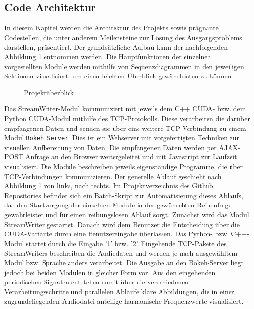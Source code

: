 
\subsection{Code Architektur}

In diesem Kapitel werden die Architektur des Projekts sowie prägnante Codestellen, die unter anderem Meilensteine zur Lösung des Ausgangsproblems darstellen, präsentiert. Der grundsätzliche Aufbau kann der nachfolgenden Abbildung \ref{fig:OV} entnommen werden. Die Hauptfunktionen der einzelnen vorgestellten Module werden mithilfe von Sequenzdiagrammen in den jeweiligen Sektionen visualisiert, um einen leichten Überblick gewährleisten zu können.

\begin{figure}[hbt!]
	\centering      
	\def\svgscale{0.75}
	
	\caption{Projektüberblick}
	\label{fig:OV}
\end{figure}

Das StreamWriter-Modul kommuniziert mit jeweils dem C++ CUDA- bzw. dem Python CUDA-Modul mithilfe des TCP-Protokolls. Diese verarbeiten die darüber empfangenen Daten und senden sie über eine weitere TCP-Verbindung zu einem Modul \texttt{Bokeh Server}. Dies ist ein Webserver mit vorgefertigten Techniken zur visuellen Aufbereitung von Daten. Die empfangenen Daten werden per AJAX-POST Anfrage an den Browser weitergeleitet und mit Javascript zur Laufzeit visualisiert. Die Module beschreiben jeweils eigenständige Programme, die über TCP-Verbindungen kommunizieren. Der generelle Ablauf geschieht nach Abbildung \ref{fig:OV} von links, nach rechts. Im Projektverzeichnis des Github Repositories \cite{fahaba_github} befindet sich ein Batch-Skript zur Automatisierung dieses Ablaufs, das den Startvorgang der einzelnen Module in der gewünschten Reihenfolge gewährleistet und für einen reibungslosen Ablauf sorgt. Zunächst wird das Modul StreamWriter gestartet. Danach wird dem Benutzer die Entscheidung über die CUDA-Variante durch eine Benutzereingabe überlassen. Das Python- bzw. C++-Modul startet durch die Eingabe '1' bzw. '2'. Eingehende TCP-Pakete des StreamWriters beschreiben die Audiodaten und werden je nach ausgewähltem Modul bzw. Sprache anders verarbeitet. Die Ausgabe an den Bokeh-Server liegt jedoch bei beiden Modulen in gleicher Form vor. Aus den eingehenden periodischen Signalen entstehen somit über die verschiedenen Verarbeitungsschritte und parallelen Abläufe klare Abbildungen, die in einer zugrundeliegenden Audiodatei anteilige harmonische Frequenzwerte visualisiert. 

